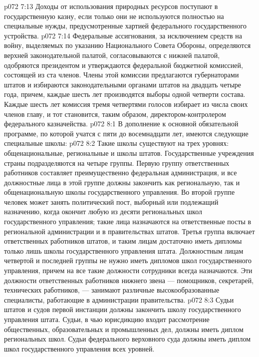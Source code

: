 \vs p072 7:13 \pc {}\bibnobreakspace {} Доходы от использования природных ресурсов поступают в государственную казну, если только они не используются полностью на специальные нужды, предусмотренные хартией федерального государственного устройства.
\vs p072 7:14 \pc Федеральные ассигнования, за исключением средств на войну, выделяемых по указанию Национального Совета Обороны, определяются верхней законодательной палатой, согласовываются с нижней палатой, одобряются президентом и утверждаются федеральной бюджетной комиссией, состоящей из ста членов. Члены этой комиссии предлагаются губернаторами штатов и избираются законодательными органами штатов на двадцать четыре года, причем, каждые шесть лет производятся выборы одной четверти состава. Каждые шесть лет комиссия тремя четвертями голосов избирает из числа своих членов главу, и тот становится, таким образом, директором\hyp{}контролером федерального казначейства.
\vs p072 8:1 В дополнение к основной обязательной программе, по которой учатся с пяти до восемнадцати лет, имеются следующие специальные школы:
\vs p072 8:2 \bibnobreakspace {} Такие школы существуют на трех уровнях: общенациональные, региональные и школы штатов. Государственные учреждения страны подразделяются на четыре группы. Первую группу ответственных работников составляет преимущественно федеральная администрация, и все должностные лица в этой группе должны закончить как региональную, так и общенациональную школы государственного управления. Во второй группе человек может занять политический пост, выборный или подлежащий назначению, когда окончит любую из десяти региональных школ государственного управления; такие лица назначаются на ответственные посты в региональной администрации и в правительствах штатов. Третья группа включает ответственных работников штатов, и таким лицам достаточно иметь дипломы только лишь школы государственного управления штата. Должностным лицам четвертой и последней группы не нужно иметь дипломов школ государственного управления, причем на все такие должности сотрудники всегда назначаются. Эти должности ответственных работников нижнего звена --- помощников, секретарей, технических работников, --- занимают различные высокообразованные специалисты, работающие в администрации правительства.
\vs p072 8:3 Судьи штатов и судов первой инстанции должны закончить школу государственного управления штата. Судьи, в чью юрисдикцию входит рассмотрение общественных, образовательных и промышленных дел, должны иметь диплом региональных школ. Судьи федерального верховного суда должны иметь диплом школ государственного управления всех уровней.
